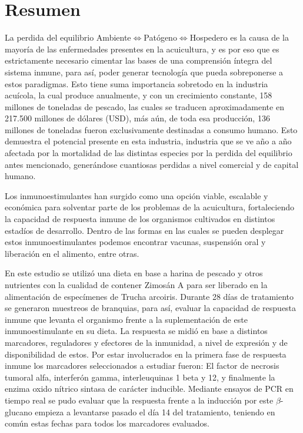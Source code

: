 \documentclass[12pt,letterpaper,oneside]{scrbook}
\begin{document}
\clearpage

\frontmatter

\chapter{Resumen}

La perdida del equilibrio
Ambiente\(\Leftrightarrow\)Patógeno\(\Leftrightarrow\)Hospedero es la
causa de la mayoría de las enfermedades presentes en la acuicultura, y
es por eso que es estrictamente necesario cimentar las bases de una
comprensión íntegra del sistema inmune, para así, poder generar
tecnología que pueda sobreponerse a estos paradigmas. Esto tiene suma
importancia sobretodo en la industria acuícola, la cual produce
anualmente, y con un crecimiento constante, 158 millones de toneladas de
pescado, las cuales se traducen aproximadamente en 217.500 millones de
dólares (USD), más aún, de toda esa producción, 136 millones de
toneladas fueron exclusivamente destinadas a consumo humano. Esto
demuestra el potencial presente en esta industria, industria que se ve
año a año afectada por la mortalidad de las distintas especies por la
perdida del equilibrio antes mencionado, generándose cuantiosas perdidas
a nivel comercial y de capital humano.

Los inmunoestimulantes han surgido como una opción viable, escalable y
económica para solventar parte de los problemas de la acuicultura,
fortaleciendo la capacidad de respuesta inmune de los organismos
cultivados en distintos estadíos de desarrollo. Dentro de las formas en
las cuales se pueden desplegar estos inmunoestimulantes podemos
encontrar vacunas, suspensión oral y liberación en el alimento, entre
otras.

En este estudio se utilizó una dieta en base a harina de pescado y otros
nutrientes con la cualidad de contener Zimosán A para ser liberado en la
alimentación de especímenes de Trucha arcoiris. Durante 28 días de
tratamiento se generaron muestreos de branquias, para así, evaluar la
capacidad de respuesta inmune que levanta el organismo frente a la
suplementación de este inmunoestimulante en su dieta. La respuesta se
midió en base a distintos marcadores, reguladores y efectores de la
inmunidad, a nivel de expresión y de disponibilidad de estos. Por estar
involucrados en la primera fase de respuesta inmune los marcadores
seleccionados a estudiar fueron: El factor de necrosis tumoral alfa,
interferón gamma, interleuquinas 1 beta y 12, y finalmente la enzima
oxido nítrico sintasa de carácter inducible. Mediante ensayos de PCR en
tiempo real se pudo evaluar que la respuesta frente a la inducción por
este \(\beta\)-glucano empieza a levantarse pasado el día 14 del
tratamiento, teniendo en común estas fechas para todos los marcadores
evaluados.
\end{document}
